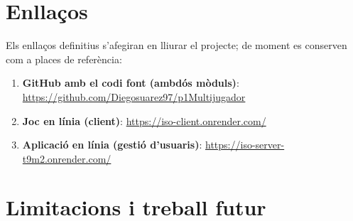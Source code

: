 \documentclass[11pt,a4paper]{article}
\begin{document}
\section{Enllaços}
\label{sec:enllacos}

Els enllaços definitius s'afegiran en lliurar el projecte; de moment es conserven com a
places de referència:

\begin{enumerate}
  \item \textbf{GitHub amb el codi font (ambdós mòduls)}:
        \url{https://github.com/Diegosuarez97/p1Multijugador}
  \item \textbf{Joc en línia (client)}:
        \url{https://iso-client.onrender.com/}
  \item \textbf{Aplicació en línia (gestió d'usuaris)}:
        \url{https://iso-server-t9m2.onrender.com/}
\end{enumerate}

\section{Limitacions i treball futur}
\label{sec:limitacions}
\end{document}
